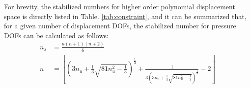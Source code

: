 For brevity, the stabilized numbers for higher order polynomial displacement space is directly listed in Table. \ref{tab:constraint},
and it can be summarized that, for a given number of displacement DOFs, the stabilized number for pressure DOFs can be calculated as follows:
\begin{align}
    n_s &= \frac{n(n + 1)(n + 2)}{6} \\ 
    n&= 
    \left \lfloor
    \left (3n_u + \frac{1}{3}\sqrt{81n_u^2 - \frac{1}{3}} \right )^{\frac{1}{3}}
    +
    \frac{1}{
        3\left (3n_u + \frac{1}{3}\sqrt{81n_u^2 - \frac{1}{3}} \right )^{\frac{1}{3}}
    } - 2
    \right \rfloor
\end{align}

